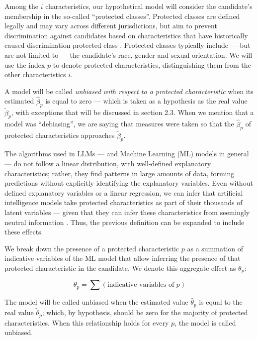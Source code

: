 \documentclass[jair,11pt,letterpaper]{article}
\begin{document}
Among the $i$ characteristics, our hypothetical model will consider the
candidate's membership in the so-called ``protected classes''. Protected classes
are defined legally and may vary across different
jurisdictions, but aim to prevent discrimination against candidates based on
characteristics that have historically caused discrimination protected
class \cite{heymann2021}. Protected classes typically
include --- but are not limited to --- the candidate's race, gender
and sexual orientation. We will use the index $p$ to denote
protected characteristics, distinguishing them from the other characteristics
$i$.

A model will be called \textit{unbiased with respect to a protected characteristic}
when its estimated $\hat{\beta}_p$ is equal to zero --- which is taken
as a hypothesis as the real value $\tilde{\beta}_p$, with exceptions that will be discussed
in section 2.3. When we mention that a model was ``debiasing'',
we are saying that measures were taken so that the $\hat{\beta}_p$ of
protected characteristics approaches $\tilde{\beta}_p$.

The algorithms used in LLMs --- and Machine Learning (ML) models in
general --- do not follow a linear distribution, with well-defined
explanatory characteristics; rather, they find patterns in large
amounts of data, forming predictions without explicitly identifying
the explanatory variables. Even without defined explanatory variables or
a linear regression, we can infer that artificial intelligence models
take protected characteristics as part of their thousands
of latent variables --- given that they can infer these
characteristics from seemingly neutral information \cite{bai2024}. Thus, the previous definition can be expanded to include
these effects.

We break down the presence of a protected characteristic $p$ as a
summation of indicative variables of the ML model that allow inferring the
presence of that protected characteristic in the candidate. We denote this
aggregate effect as $\theta_p$:

\begin{equation}
\theta_p = \sum(\text{indicative variables of } p)
\end{equation}

The model will be called unbiased when the estimated value $\hat{\theta}_p$ is
equal to the real value $\tilde{\theta}_p$; which, by hypothesis, should be zero for the
majority of protected characteristics. When this relationship holds for
every $p$, the model is called unbiased.
\end{document}
